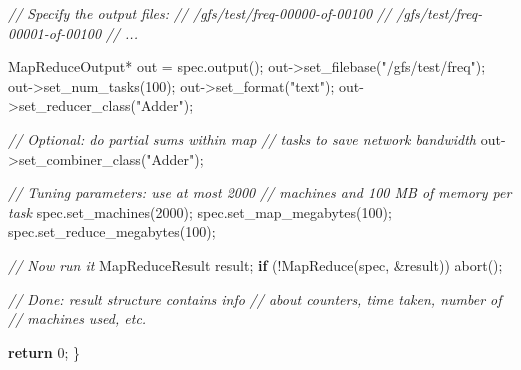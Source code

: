 \documentclass[
]{article}
\newenvironment{Shaded}{}{}
\newcommand{\CommentTok}[1]{\textcolor[rgb]{0.38,0.63,0.69}{\textit{#1}}}
\newcommand{\ControlFlowTok}[1]{\textcolor[rgb]{0.00,0.44,0.13}{\textbf{#1}}}
\newcommand{\DecValTok}[1]{\textcolor[rgb]{0.25,0.63,0.44}{#1}}
\newcommand{\NormalTok}[1]{#1}
\newcommand{\OperatorTok}[1]{\textcolor[rgb]{0.40,0.40,0.40}{#1}}
\newcommand{\StringTok}[1]{\textcolor[rgb]{0.25,0.44,0.63}{#1}}
\begin{document}
\begin{Shaded}
\begin{Highlighting}[]
    \CommentTok{// Specify the output files:}
    \CommentTok{//    /gfs/test/freq{-}00000{-}of{-}00100}
    \CommentTok{//    /gfs/test/freq{-}00001{-}of{-}00100}
    \CommentTok{//    ...}

\NormalTok{    MapReduceOutput}\OperatorTok{*}\NormalTok{ out }\OperatorTok{=}\NormalTok{ spec}\OperatorTok{.}\NormalTok{output}\OperatorTok{();}
\NormalTok{    out}\OperatorTok{{-}\textgreater{}}\NormalTok{set\_filebase}\OperatorTok{(}\StringTok{"/gfs/test/freq"}\OperatorTok{);}
\NormalTok{    out}\OperatorTok{{-}\textgreater{}}\NormalTok{set\_num\_tasks}\OperatorTok{(}\DecValTok{100}\OperatorTok{);}
\NormalTok{    out}\OperatorTok{{-}\textgreater{}}\NormalTok{set\_format}\OperatorTok{(}\StringTok{"text"}\OperatorTok{);}
\NormalTok{    out}\OperatorTok{{-}\textgreater{}}\NormalTok{set\_reducer\_class}\OperatorTok{(}\StringTok{"Adder"}\OperatorTok{);}

    \CommentTok{// Optional: do partial sums within map}
    \CommentTok{// tasks to save network bandwidth}
\NormalTok{    out}\OperatorTok{{-}\textgreater{}}\NormalTok{set\_combiner\_class}\OperatorTok{(}\StringTok{"Adder"}\OperatorTok{);}

    \CommentTok{// Tuning parameters: use at most 2000}
    \CommentTok{// machines and 100 MB of memory per task}
\NormalTok{    spec}\OperatorTok{.}\NormalTok{set\_machines}\OperatorTok{(}\DecValTok{2000}\OperatorTok{);}
\NormalTok{    spec}\OperatorTok{.}\NormalTok{set\_map\_megabytes}\OperatorTok{(}\DecValTok{100}\OperatorTok{);}
\NormalTok{    spec}\OperatorTok{.}\NormalTok{set\_reduce\_megabytes}\OperatorTok{(}\DecValTok{100}\OperatorTok{);}

    \CommentTok{// Now run it}
\NormalTok{    MapReduceResult result}\OperatorTok{;}
    \ControlFlowTok{if} \OperatorTok{(!}\NormalTok{MapReduce}\OperatorTok{(}\NormalTok{spec}\OperatorTok{,} \OperatorTok{\&}\NormalTok{result}\OperatorTok{))}\NormalTok{ abort}\OperatorTok{();}

    \CommentTok{// Done: \textquotesingle{}result\textquotesingle{} structure contains info}
    \CommentTok{// about counters, time taken, number of}
    \CommentTok{// machines used, etc.}

    \ControlFlowTok{return} \DecValTok{0}\OperatorTok{;}
\OperatorTok{\}} 
\end{Highlighting}
\end{Shaded}
\end{document}
